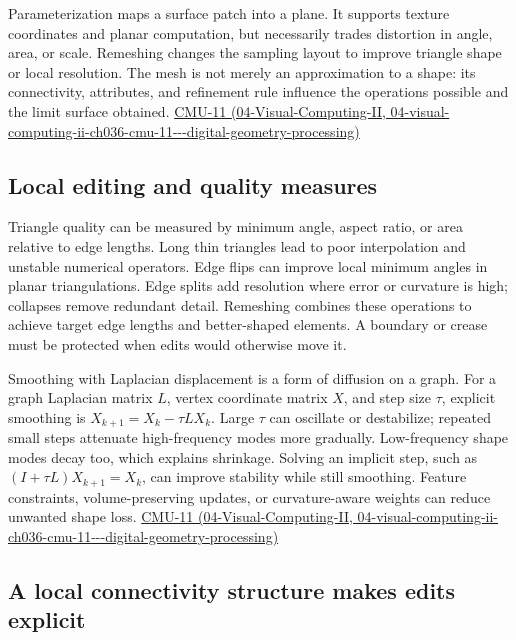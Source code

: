 Parameterization maps a surface patch into a plane. It supports texture coordinates and planar computation, but necessarily trades distortion in angle, area, or scale. Remeshing changes the sampling layout to improve triangle shape or local resolution. The mesh is not merely an approximation to a shape: its connectivity, attributes, and refinement rule influence the operations possible and the limit surface obtained. \href{../04-Visual-Computing-II/main.pdf\#nameddest=04-visual-computing-ii-ch036-cmu-11---digital-geometry-processing}{CMU-11 (04-Visual-Computing-II, 04-visual-computing-ii-ch036-cmu-11-\/-\/-digital-geometry-processing)}

\subsection{Local editing and quality measures}\label{03-visual-computing-i-ch002-local-editing-and-quality-measures}

Triangle quality can be measured by minimum angle, aspect ratio, or area relative to edge lengths. Long thin triangles lead to poor interpolation and unstable numerical operators. Edge flips can improve local minimum angles in planar triangulations. Edge splits add resolution where error or curvature is high; collapses remove redundant detail. Remeshing combines these operations to achieve target edge lengths and better-shaped elements. A boundary or crease must be protected when edits would otherwise move it.

Smoothing with Laplacian displacement is a form of diffusion on a graph. For a graph Laplacian matrix \(L\), vertex coordinate matrix \(X\), and step size \(\tau\), explicit smoothing is \(X_{k+1}=X_k-\tau LX_k\). Large \(\tau\) can oscillate or destabilize; repeated small steps attenuate high-frequency modes more gradually. Low-frequency shape modes decay too, which explains shrinkage. Solving an implicit step, such as \((I+\tau L)X_{k+1}=X_k\), can improve stability while still smoothing. Feature constraints, volume-preserving updates, or curvature-aware weights can reduce unwanted shape loss. \href{../04-Visual-Computing-II/main.pdf\#nameddest=04-visual-computing-ii-ch036-cmu-11---digital-geometry-processing}{CMU-11 (04-Visual-Computing-II, 04-visual-computing-ii-ch036-cmu-11-\/-\/-digital-geometry-processing)}

\subsection{A local connectivity structure makes edits explicit}\label{03-visual-computing-i-ch002-a-local-connectivity-structure-makes-edits-explicit}

